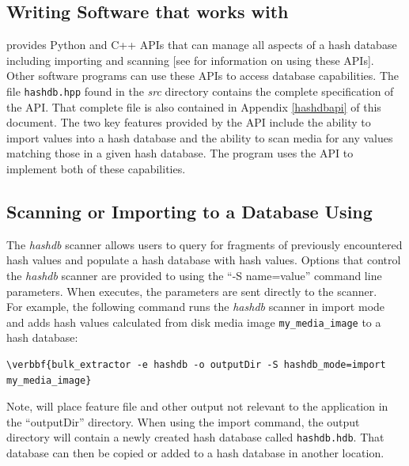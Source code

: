 \documentclass[11pt,fleqn]{article} %
\begin{document}
\subsection{Writing Software that works with \hdb}
\label{APISection}
\hdb provides Python and C++ APIs that can manage all aspects of a hash database
including importing and scanning [see \textbf{} for information on using these APIs].
Other software programs can use these APIs to access database capabilities. The file \texttt{hashdb.hpp} found in the \textit{src} directory contains the complete specification of the API. That complete file is also contained in Appendix \ref{hashdbapi} of this document.  The two key features provided by the API include the ability to import values into a hash database and the ability to scan media for any values matching those in a given hash database.  The \bulk program uses the \hdb API to implement both of these capabilities.\\

\subsection{Scanning or Importing to a Database Using \bulk}
\label{bulkextractorSection}
The \bulk \textit{hashdb} scanner allows users to query for fragments of previously encountered hash values and populate a hash database with hash values. Options that control the \textit{hashdb} scanner are provided to \bulk using the ``-S name=value'' command line parameters. When \bulk executes, the parameters are sent directly to the scanner.\\

For example, the following command runs the \bulk \textit{hashdb} scanner in import mode and adds hash values calculated from disk media image \texttt{my\_media\_image} to a hash database:
\begin{Verbatim}[commandchars=\\\{\}]
\verbbf{bulk_extractor -e hashdb -o outputDir -S hashdb_mode=import my_media_image}
\end{Verbatim}
Note, \bulk will place feature file and other output not relevant to the \hdb application in the ``outputDir'' directory. When using the import command, the output directory will contain a newly created hash database called \texttt{hashdb.hdb}. That database can then be copied or added to a hash database in another location.
\end{document}
